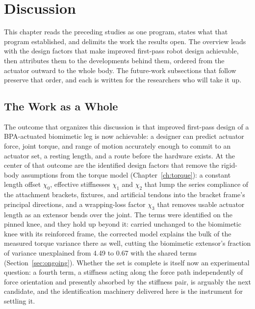 \chapter{Discussion}\label{ch:overall}\label{ch:futurework}
\graphicspath{{../Figures/70-overall/}{figs/70-overall/}}

This chapter reads the preceding studies as one program, states what that program established, and delimits the work the results open. The overview leads with the design factors that make improved first-pass robot design achievable, then attributes them to the developments behind them, ordered from the actuator outward to the whole body. The future-work subsections that follow preserve that order, and each is written for the researchers who will take it up.

\section{The Work as a Whole}\label{sec:foundation}

The outcome that organizes this discussion is that improved first-pass design of a BPA-actuated biomimetic leg is now achievable: a designer can predict actuator force, joint torque, and range of motion accurately enough to commit to an actuator set, a resting length, and a route before the hardware exists. At the center of that outcome are the identified design factors that remove the rigid-body assumptions from the torque model (Chapter~\ref{ch:torque}): a constant length offset $\chi_{0}$, effective stiffnesses $\chi_{1}$ and $\chi_{2}$ that lump the series compliance of the attachment brackets, fixtures, and artificial tendons into the bracket frame's principal directions, and a wrapping-loss factor $\chi_{3}$ that removes usable actuator length as an extensor bends over the joint. The terms were identified on the pinned knee, and they hold up beyond it: carried unchanged to the biomimetic knee with its reinforced frame, the corrected model explains the bulk of the measured torque variance there as well, cutting the biomimetic extensor's fraction of variance unexplained from 4.49 to 0.67 with the shared terms (Section~\ref{sec:ongoing}). Whether the set is complete is itself now an experimental question: a fourth term, a stiffness acting along the force path independently of force orientation and presently absorbed by the stiffness pair, is arguably the next candidate, and the identification machinery delivered here is the instrument for settling it.

